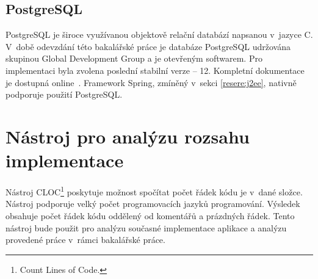     \subsection{PostgreSQL}
        PostgreSQL je široce využívanou objektově relační databází napsanou v~jazyce C. V~době odevzdání této bakalářské práce je databáze PostgreSQL udržována skupinou Global Development Group a je otevřeným softwarem. Pro implementaci byla zvolena poslední stabilní verze -- 12. Kompletní dokumentace je dostupná online~\cite{postgres-documentation}. Framework Spring, zmíněný v~sekci \ref{resere:j2ee}, nativně podporuje použití PostgreSQL.
        

\section{Nástroj pro analýzu rozsahu implementace}\label{reserse:cloc}
    Nástroj CLOC\footnote{Count Lines of Code.}\cite{cloc-download} poskytuje možnost spočítat počet řádek kódu je v~dané složce. Nástroj podporuje velký počet programovacích jazyků programování. Výsledek obsahuje počet řádek kódu oddělený od komentářů a prázdných řádek. Tento nástroj bude použit pro analýzu současné implementace aplikace a analýzu provedené práce v~rámci bakalářské práce.